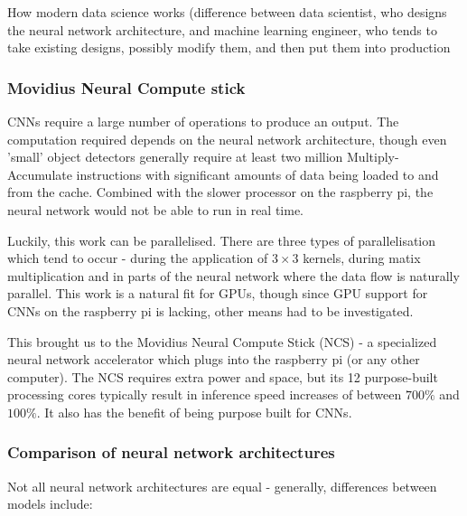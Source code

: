 How modern data science works (difference between data scientist, who designs the neural network architecture, and machine learning engineer, who tends to take existing designs, possibly modify them, and then put them into production

\subsubsection{Movidius Neural Compute stick}
CNNs require a large number of operations to produce an output. The computation required depends on the neural network architecture, though even 'small' object detectors generally require at least two million Multiply-Accumulate instructions with significant amounts of data being loaded to and from the cache. Combined with the slower processor on the raspberry pi, the neural network would not be able to run in real time.


Luckily, this work can be parallelised. There are three types of parallelisation which tend to occur - during the application of $3 \times 3$ kernels, during matix multiplication and in parts of the neural network where the data flow is naturally parallel. This work is a natural fit for GPUs, though since GPU support for CNNs on the raspberry pi is lacking, other means had to be investigated.


This brought us to the Movidius Neural Compute Stick (NCS) - a specialized neural network accelerator which plugs into the raspberry pi (or any other computer). The NCS requires extra power and space, but its 12 purpose-built processing cores typically result in inference speed increases of between $700\%$ and $100\%$. It also has the benefit of being purpose built for CNNs.


\subsubsection{Comparison of neural network architectures}
Not all neural network architectures are equal - generally, differences between models include:

